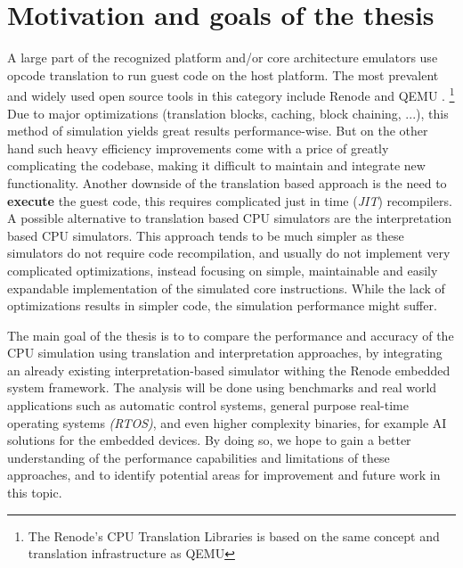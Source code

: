 \section{Motivation and goals of the thesis}

A large part of the recognized platform and/or core architecture emulators use opcode translation to run guest code
on the host platform. The most prevalent and widely used open source tools in this category include Renode \cite{Renode}
and QEMU \cite{Qemu}.%
\footnote{The Renode's CPU Translation Libraries is based on the same concept and translation infrastructure as QEMU}
Due to major optimizations (translation blocks, caching, block chaining, ...), this method of  simulation yields
great results performance-wise. But on the other hand such heavy efficiency improvements come with a price 
of greatly 
complicating the codebase, making it difficult to maintain and integrate new functionality. Another downside of the
translation based approach is the need to \textbf{execute} the guest code, 
%
this requires complicated just in
time (\textit{JIT}) recompilers. A possible alternative to translation based CPU simulators are the interpretation
based CPU simulators. This approach tends to be much simpler as these simulators do not require code recompilation,
and usually do not implement very complicated optimizations, instead focusing on simple, maintainable and easily
expandable implementation of the simulated core instructions. While the lack of optimizations results in simpler
code, the simulation performance might suffer.

The main goal of the thesis is to to compare the performance and accuracy of the CPU simulation using translation
and interpretation approaches, by integrating an already existing interpretation-based simulator withing the Renode
embedded system framework. The analysis will be done using benchmarks and real world applications such as automatic control
systems, general purpose real-time operating systems \textit{(RTOS)}, and even higher complexity binaries, for example AI solutions for the embedded devices.
By doing so, we hope to gain a better understanding of the performance capabilities and limitations of these approaches,
and to identify potential areas for improvement and future work in this topic.

